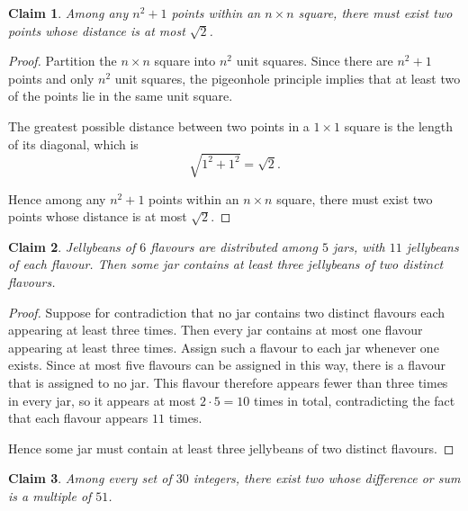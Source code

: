 \documentclass{article}
\newtheorem{claim}{Claim}
\begin{document}
\begin{claim}
    Among any $n^2 + 1$ points within an $n \times n$ square, there must exist two points whose distance 
    is at most $\sqrt{2}$.
\end{claim}

\begin{proof}
    Partition the $n \times n$ square into $n^2$ unit squares. Since there are $n^2 + 1$ points and only 
    $n^2$ unit squares, the pigeonhole principle implies that at least two of the points lie in the same 
    unit square.

    \medskip

    The greatest possible distance between two points in a $1 \times 1$ square is the length of its 
    diagonal, which is
    \[
    \sqrt{1^2+1^2}=\sqrt{2}.
    \]

    \medskip

    Hence among any $n^2 + 1$ points within an $n \times n$ square, there must exist two points whose 
    distance is at most $\sqrt{2}$.
\end{proof}

\begin{claim}
    Jellybeans of $6$ flavours are distributed among $5$ jars, with $11$ jellybeans of each flavour. 
    Then some jar contains at least three jellybeans of two distinct flavours.
\end{claim}

\begin{proof}
    Suppose for contradiction that no jar contains two distinct flavours each appearing at least three
    times. Then every jar contains at most one flavour appearing at least three times. Assign such a
    flavour to each jar whenever one exists. Since at most five flavours can be assigned in this way,
    there is a flavour that is assigned to no jar. This flavour therefore appears fewer than three times 
    in every jar, so it appears at most $2 \cdot 5 = 10$ times in total, contradicting the fact that each 
    flavour appears $11$ times.

    \medskip

    Hence some jar must contain at least three jellybeans of two distinct flavours.
\end{proof}

\begin{claim}
    Among every set of $30$ integers, there exist two whose difference or sum is a multiple of $51$.
\end{claim}
\end{document}
